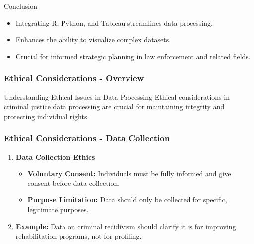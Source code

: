 \documentclass[aspectratio=169]{beamer}
\begin{document}
\begin{frame}{Conclusion}
    \begin{itemize}
        \item Integrating R, Python, and Tableau streamlines data processing.
        \item Enhances the ability to visualize complex datasets.
        \item Crucial for informed strategic planning in law enforcement and related fields.
    \end{itemize}
\end{frame}

\begin{frame}[fragile]
    \frametitle{Ethical Considerations - Overview}
    \begin{block}{Understanding Ethical Issues in Data Processing}
        Ethical considerations in criminal justice data processing are crucial for maintaining integrity and protecting individual rights.
    \end{block}
\end{frame}

\begin{frame}[fragile]
    \frametitle{Ethical Considerations - Data Collection}
    \begin{enumerate}
        \item \textbf{Data Collection Ethics}
        \begin{itemize}
            \item \textbf{Voluntary Consent:} Individuals must be fully informed and give consent before data collection.
            \item \textbf{Purpose Limitation:} Data should only be collected for specific, legitimate purposes.
        \end{itemize}
        \item \textbf{Example:} Data on criminal recidivism should clarify it is for improving rehabilitation programs, not for profiling.
    \end{enumerate}
\end{frame}
\end{document}
